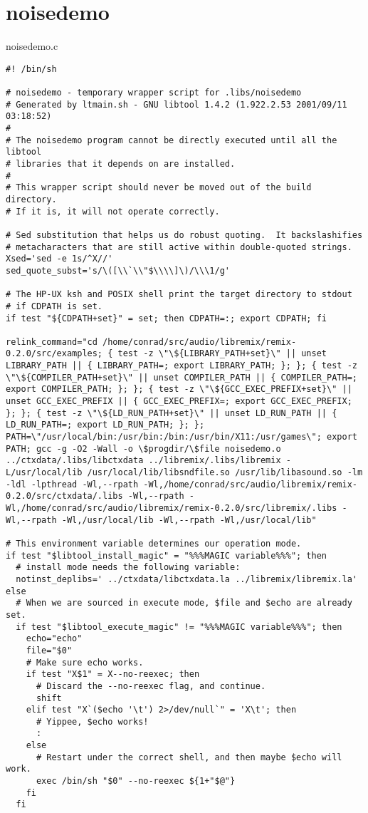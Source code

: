 \section{noisedemo}
noisedemo.c 

\footnotesize\begin{verbatim}#! /bin/sh

# noisedemo - temporary wrapper script for .libs/noisedemo
# Generated by ltmain.sh - GNU libtool 1.4.2 (1.922.2.53 2001/09/11 03:18:52)
#
# The noisedemo program cannot be directly executed until all the libtool
# libraries that it depends on are installed.
#
# This wrapper script should never be moved out of the build directory.
# If it is, it will not operate correctly.

# Sed substitution that helps us do robust quoting.  It backslashifies
# metacharacters that are still active within double-quoted strings.
Xsed='sed -e 1s/^X//'
sed_quote_subst='s/\([\\`\\"$\\\\]\)/\\\1/g'

# The HP-UX ksh and POSIX shell print the target directory to stdout
# if CDPATH is set.
if test "${CDPATH+set}" = set; then CDPATH=:; export CDPATH; fi

relink_command="cd /home/conrad/src/audio/libremix/remix-0.2.0/src/examples; { test -z \"\${LIBRARY_PATH+set}\" || unset LIBRARY_PATH || { LIBRARY_PATH=; export LIBRARY_PATH; }; }; { test -z \"\${COMPILER_PATH+set}\" || unset COMPILER_PATH || { COMPILER_PATH=; export COMPILER_PATH; }; }; { test -z \"\${GCC_EXEC_PREFIX+set}\" || unset GCC_EXEC_PREFIX || { GCC_EXEC_PREFIX=; export GCC_EXEC_PREFIX; }; }; { test -z \"\${LD_RUN_PATH+set}\" || unset LD_RUN_PATH || { LD_RUN_PATH=; export LD_RUN_PATH; }; }; PATH=\"/usr/local/bin:/usr/bin:/bin:/usr/bin/X11:/usr/games\"; export PATH; gcc -g -O2 -Wall -o \$progdir/\$file noisedemo.o  ../ctxdata/.libs/libctxdata ../libremix/.libs/libremix -L/usr/local/lib /usr/local/lib/libsndfile.so /usr/lib/libasound.so -lm -ldl -lpthread -Wl,--rpath -Wl,/home/conrad/src/audio/libremix/remix-0.2.0/src/ctxdata/.libs -Wl,--rpath -Wl,/home/conrad/src/audio/libremix/remix-0.2.0/src/libremix/.libs -Wl,--rpath -Wl,/usr/local/lib -Wl,--rpath -Wl,/usr/local/lib"

# This environment variable determines our operation mode.
if test "$libtool_install_magic" = "%%%MAGIC variable%%%"; then
  # install mode needs the following variable:
  notinst_deplibs=' ../ctxdata/libctxdata.la ../libremix/libremix.la'
else
  # When we are sourced in execute mode, $file and $echo are already set.
  if test "$libtool_execute_magic" != "%%%MAGIC variable%%%"; then
    echo="echo"
    file="$0"
    # Make sure echo works.
    if test "X$1" = X--no-reexec; then
      # Discard the --no-reexec flag, and continue.
      shift
    elif test "X`($echo '\t') 2>/dev/null`" = 'X\t'; then
      # Yippee, $echo works!
      :
    else
      # Restart under the correct shell, and then maybe $echo will work.
      exec /bin/sh "$0" --no-reexec ${1+"$@"}
    fi
  fi


\end{verbatim}

